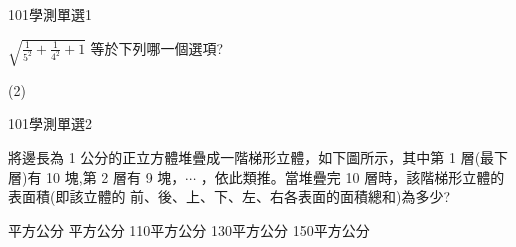 \begin{QUESTIONS}
    \begin{QUESTION}
        \begin{ExamInfo}{101}{學測}{單選}{1}
        \end{ExamInfo}
        \begin{ExamAnsRateInfo}{77}{98}{89}{44}
        \end{ExamAnsRateInfo}
        \begin{QBODY}
			$\sqrt{\frac{1}{5^2}+\frac{1}{4^2}+1}$ 等於下列哪一個選項? 
			\begin{QOPS} 
			\end{QOPS}
        \end{QBODY}
        \begin{QFROMS}
        \end{QFROMS}
        \begin{QTAGS}\end{QTAGS}
        \begin{QANS}
            (2)
        \end{QANS}
        \begin{QSOLLIST}
        \end{QSOLLIST}
        \begin{QEMPTYSPACE}
        \end{QEMPTYSPACE}
    \end{QUESTION}
    \begin{QUESTION}
        \begin{ExamInfo}{101}{學測}{單選}{2}
        \end{ExamInfo}
        \begin{ExamAnsRateInfo}{87}{99}{98}{64}
        \end{ExamAnsRateInfo}
        \begin{QBODY}
			將邊長為 1 公分的正立方體堆疊成一階梯形立體，如下圖所示，其中第 1 層(最下層)有 10 塊,第 2 層有 9 塊，$\cdots$ ，依此類推。當堆疊完 10 層時，該階梯形立體的表面積(即該立體的 前、後、上、下、左、右各表面的面積總和)為多少?
			\begin{QOPS}
				\QOP 75 平方公分 
				\QOP 90 平方公分 
				\QOP 110平方公分 
				\QOP 130平方公分 
				\QOP 150平方公分
			\end{QOPS}
			

\end{QBODY}
\end{QUESTION}
\end{QUESTIONS}
